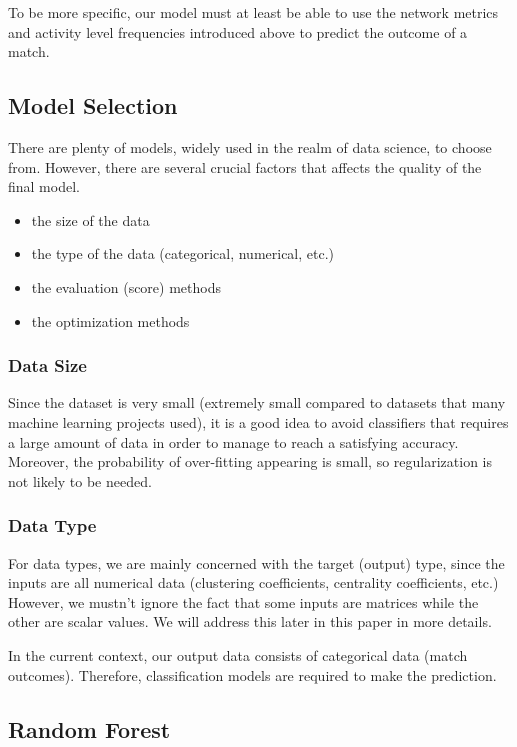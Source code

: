 \documentclass{mcmthesis}
\begin{document}
To be more specific, our model must at least be able to use the network metrics and activity level frequencies introduced above to predict the outcome of a match.

\subsection{Model Selection}

There are plenty of models, widely used in the realm of data science,
to choose from. However, there are several
crucial factors that affects the quality of the final model.

\begin{itemize}
    \item the size of the data
    \item the type of the data (categorical, numerical, etc.)
    \item the evaluation (score) methods
    \item the optimization methods
\end{itemize}

\subsubsection{Data Size}

Since the dataset is very small (extremely small compared to datasets that
many machine learning projects used), it is a good idea to avoid classifiers
that requires a large amount of data in order to manage to reach a satisfying
accuracy. Moreover, the probability of over-fitting appearing is small, 
so regularization is not likely to be needed.

\subsubsection{Data Type}

For data types, we are mainly concerned with the target (output) type, since
the inputs are all numerical data (clustering coefficients, centrality coefficients, etc.) However, we mustn't ignore the fact that some inputs are
matrices while the other are scalar values. We will address this later in this
paper in more details.

In the current context, our output data consists of categorical data (match outcomes). Therefore, classification models are required to make the prediction.

\subsection{Random Forest}
\end{document}
